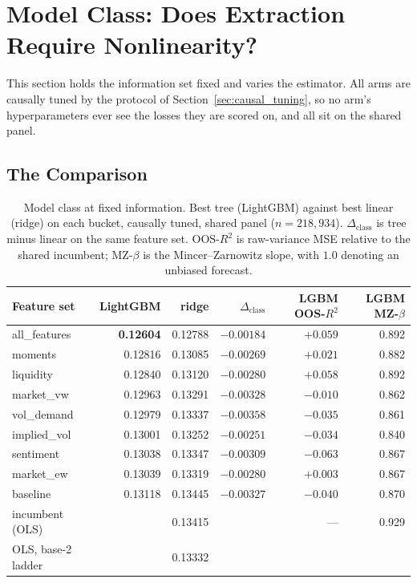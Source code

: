 \section{Model Class: Does Extraction Require Nonlinearity?}
\label{sec:linvsnonlin}

This section holds the information set fixed and varies the estimator. All
arms are causally tuned by the protocol of Section~\ref{sec:causal_tuning}, so
no arm's hyperparameters ever see the losses they are scored on, and all sit on
the shared panel.

\subsection{The Comparison}
\label{sec:class_table}

\begin{table}[H]
\centering
\caption{Model class at fixed information. Best tree (LightGBM) against best
linear (ridge) on each bucket, causally tuned, shared panel
($n = 218{,}934$). $\Delta_{\text{class}}$ is tree minus linear on the same
feature set. OOS-$R^2$ is raw-variance MSE relative to the shared incumbent;
MZ-$\beta$ is the Mincer--Zarnowitz slope, with $1.0$ denoting an unbiased
forecast.}
\label{tab:class}
\begin{tabular}{lrrrrr}
\toprule
Feature set & LightGBM & ridge & $\Delta_{\text{class}}$ & LGBM OOS-$R^2$ & LGBM MZ-$\beta$ \\
\midrule
all\_features & \textbf{0.12604} & 0.12788 & $-0.00184$ & $+0.059$ & 0.892 \\
moments       & 0.12816 & 0.13085 & $-0.00269$ & $+0.021$ & 0.882 \\
liquidity     & 0.12840 & 0.13120 & $-0.00280$ & $+0.058$ & 0.892 \\
market\_vw    & 0.12963 & 0.13291 & $-0.00328$ & $-0.010$ & 0.862 \\
vol\_demand   & 0.12979 & 0.13337 & $-0.00358$ & $-0.035$ & 0.861 \\
implied\_vol  & 0.13001 & 0.13252 & $-0.00251$ & $-0.034$ & 0.840 \\
sentiment     & 0.13038 & 0.13347 & $-0.00309$ & $-0.063$ & 0.867 \\
market\_ew    & 0.13039 & 0.13319 & $-0.00280$ & $+0.003$ & 0.867 \\
baseline      & 0.13118 & 0.13445 & $-0.00327$ & $-0.040$ & 0.870 \\
\midrule
incumbent (OLS) & \multicolumn{2}{r}{0.13415} & & --- & 0.929 \\
OLS, base-2 ladder & \multicolumn{2}{r}{0.13332} & & & \\
\bottomrule
\end{tabular}
\end{table}

